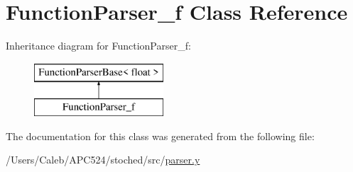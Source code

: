 \hypertarget{class_function_parser__f}{}\section{Function\+Parser\+\_\+f Class Reference}
\label{class_function_parser__f}
Inheritance diagram for Function\+Parser\+\_\+f\+:\begin{figure}[H]
\begin{center}
\leavevmode
\includegraphics[height=2.000000cm]{class_function_parser__f}
\end{center}
\end{figure}


The documentation for this class was generated from the following file\+:\begin{DoxyCompactItemize}
\item 
/\+Users/\+Caleb/\+A\+P\+C524/stoched/src/\hyperlink{parser_8y}{parser.\+y}\end{DoxyCompactItemize}
